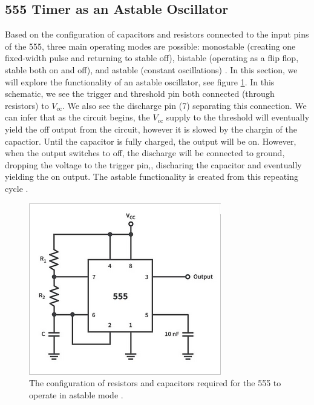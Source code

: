 \documentclass[%
 reprint,
 amsmath,amssymb,
 aps,
]{revtex4-2}
\begin{document}
    \subsection{555 Timer as an Astable Oscillator}
    Based on the configuration of capacitors and resistors connected to the input pins of the 555, three main operating modes are possible: monostable (creating one fixed-width pulse and returning to stable off), bistable (operating as a flip flop, stable both on and off), and astable (constant oscillations) \cite{555Modes}. In this section, we will explore the functionality of an astable oscillator, see figure \ref{fig:astable}. In this schematic, we see the trigger and threshold pin both connected (through resistors) to $V_{\text{cc}}$. We also see the discharge pin (7) separating this connection. We can infer that as the circuit begins, the $V_\text{cc}$ supply to the threshold will eventually yield the off output from the circuit, however it is slowed by the chargin of the capactior. Until the capacitor is fully charged, the output will be on. However, when the output switches to off, the discharge will be connected to ground, dropping the voltage to the trigger pin,, discharing the capacitor and eventually yielding the on output. The astable functionality is created from this repeating cycle \cite{555Modes}.

    \begin{figure}
        \includegraphics[width=0.9\columnwidth]{Images/astable.png}
        \caption{\label{fig:astable}The configuration of resistors and capacitors required for the 555 to operate in astable mode \cite{555Modes}.}
    \end{figure}
\end{document}
